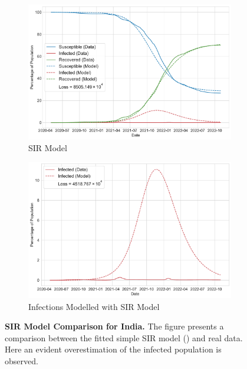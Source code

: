 \documentclass[tikz,fleqn,12pt]{wlscirep}
\begin{document}
\begin{figure}[htbp!]
  \centering
  \begin{subfigure}[t]{\textwidth}
    \centering
    \includegraphics[scale=0.35]{images/SIR_model_IND.pdf}
    \caption{SIR Model}
    \label{fig:SIR_model_IND}
  \end{subfigure}
  \begin{subfigure}[t]{\textwidth}
    \centering
    \includegraphics[scale=0.35]{images/SIR_model_infections_IND.pdf}
    \caption{Infections Modelled with SIR Model}
    \label{fig:SIR_model_infections_IND}
  \end{subfigure}
  \caption{\textbf{SIR Model Comparison for India.} The figure presents a comparison between the fitted simple SIR model () and real data. Here an evident overestimation of the infected population is observed.}
  \label{fig:SIR_model_IND_parent}
\end{figure}
\end{document}
